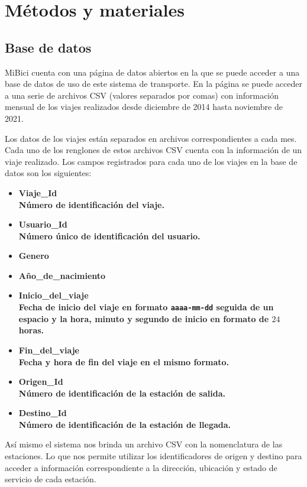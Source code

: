 \section{Métodos y materiales}

\subsection{Base de datos}
MiBici cuenta con una página de datos abiertos en la que se puede acceder a una base de datos de uso de este sistema de transporte. En la página se puede acceder a una serie de archivos CSV (valores separados por comas) con información mensual de los viajes realizados desde diciembre de 2014 hasta noviembre de 2021.
\par Los datos de los viajes están separados en archivos correspondientes a cada mes. Cada uno de los renglones de estos archivos CSV cuenta con la información de un viaje realizado. Los campos registrados para cada uno de los viajes en la base de datos son los siguientes: 
\begin{itemize}
	\item \bfseries{Viaje\_Id }\normalfont \\ Número de identificación del viaje.
	\item \bfseries{Usuario\_Id }\normalfont\\ Número único de identificación del usuario.
	\item \bfseries{Genero }\normalfont 
	\item \bfseries{Año\_de\_nacimiento }
	\item \bfseries{Inicio\_del\_viaje} \normalfont \\ Fecha de inicio del viaje en formato \lstinline|aaaa-mm-dd| seguida de un espacio y la hora, minuto y segundo de inicio en formato de $24$ horas.
	\item \bfseries{Fin\_del\_viaje }\normalfont \\ Fecha y hora de fin del viaje en el mismo formato.
	\item \bfseries{Origen\_Id }\normalfont \\ Número de identificación de la estación de salida.
	\item \bfseries{Destino\_Id }\normalfont \\ Número de identificación de la estación de llegada.
\end{itemize}
Así mismo el sistema nos brinda un archivo CSV con la nomenclatura de las estaciones. Lo que nos permite utilizar los identificadores de origen y destino para acceder a información correspondiente a la dirección, ubicación y estado de servicio de cada estación.
